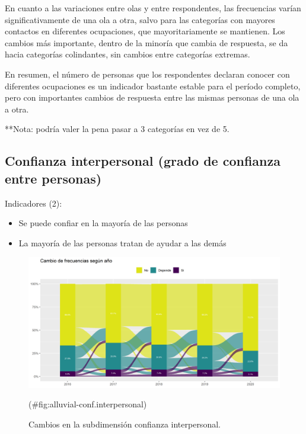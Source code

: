 \documentclass[
  12pt,
]{book}
\providecommand{\tightlist}{%
  \setlength{\itemsep}{0pt}\setlength{\parskip}{0pt}}
\begin{document}
En cuanto a las variaciones entre olas y entre respondentes, las frecuencias varían significativamente de una ola a otra, salvo para las categorías con mayores contactos en diferentes ocupaciones, que mayoritariamente se mantienen. Los cambios más importante, dentro de la minoría que cambia de respuesta, se da hacia categorías colindantes, sin cambios entre categorías extremas.

En resumen, el número de personas que los respondentes declaran conocer con diferentes ocupaciones es un indicador bastante estable para el período completo, pero con importantes cambios de respuesta entre las mismas personas de una ola a otra.

**Nota: podría valer la pena pasar a 3 categorías en vez de 5.

\hypertarget{confianza-interpersonal-grado-de-confianza-entre-personas}{%
\subsection{Confianza interpersonal (grado de confianza entre personas)}\label{confianza-interpersonal-grado-de-confianza-entre-personas}}

Indicadores (2):

\begin{itemize}
\tightlist
\item
  Se puede confiar en la mayoría de las personas
\item
  La mayoría de las personas tratan de ayudar a las demás
\end{itemize}

\begin{figure}[H]

{\centering \includegraphics[width=1\linewidth,height=1\textheight]{output/graphs/alluvial_conf.interpersonal} 

}

\caption{Cambios en la subdimensión confianza interpersonal.}(\#fig:alluvial-conf.interpersonal)
\end{figure}
\end{document}
